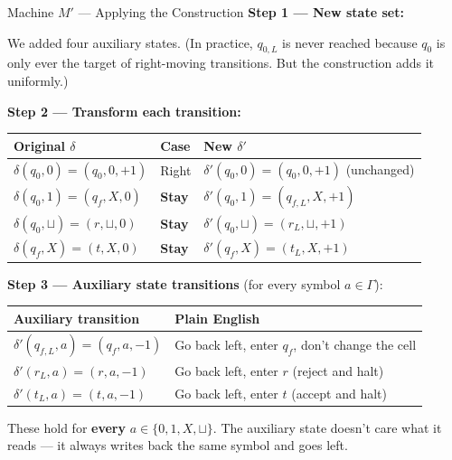 \begin{definitionbox}{Machine $M'$ --- Applying the Construction}
\textbf{Step 1 --- New state set:}

We added four auxiliary states. (In practice, $q_{0,L}$ is never reached because $q_0$ is only ever the target of right-moving transitions. But the construction adds it uniformly.)

\textbf{Step 2 --- Transform each transition:}

\begin{center}
\begin{tabular}{lll}
\toprule
\textbf{Original $\delta$} & \textbf{Case} & \textbf{New $\delta'$} \\
\midrule
$\delta(q_0, 0) = (q_0, 0, +1)$ & Right & $\delta'(q_0, 0) = (q_0, 0, +1)$ \quad (unchanged) \\
$\delta(q_0, 1) = (q_f, X, 0)$  & \textbf{Stay} & $\delta'(q_0, 1) = (q_{f,L}, X, +1)$ \\
$\delta(q_0, \sqcup) = (r, \sqcup, 0)$ & \textbf{Stay} & $\delta'(q_0, \sqcup) = (r_L, \sqcup, +1)$ \\
$\delta(q_f, X) = (t, X, 0)$    & \textbf{Stay} & $\delta'(q_f, X) = (t_L, X, +1)$ \\
\bottomrule
\end{tabular}
\end{center}

\textbf{Step 3 --- Auxiliary state transitions} (for every symbol $a \in \Gamma$):

\begin{center}
\begin{tabular}{ll}
\toprule
\textbf{Auxiliary transition} & \textbf{Plain English} \\
\midrule
$\delta'(q_{f,L}, a) = (q_f, a, -1)$ & Go back left, enter $q_f$, don't change the cell \\
$\delta'(r_L, a) = (r, a, -1)$ & Go back left, enter $r$ (reject and halt) \\
$\delta'(t_L, a) = (t, a, -1)$ & Go back left, enter $t$ (accept and halt) \\
\bottomrule
\end{tabular}
\end{center}

These hold for \textbf{every} $a \in \{0, 1, X, \sqcup\}$. The auxiliary state doesn't care what it reads --- it always writes back the same symbol and goes left.
\end{definitionbox}

